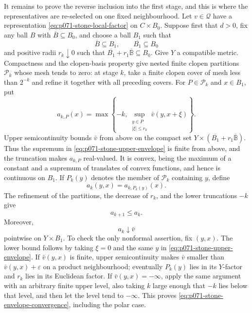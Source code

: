 It remains to prove the reverse inclusion into the first stage, and this is
where the representatives are re-selected on one fixed neighbourhood.  Let
\(v\in\mathscr Q\) have a representation
\eqref{eq:p071-stone-local-factor} on \(C\times B_0\).  Suppose first that
\(d>0\), fix any ball \(B\) with \(\overline B\subseteq B_0\), and choose a
ball \(B_1\) such that
\begin{equation}
\label{eq:p071-stone-nested-balls}
                 \overline B\subseteq B_1,
                 \qquad \overline{B_1}\subseteq B_0
\end{equation}
and positive radii \(r_k\downarrow0\) such that
\(\overline{B_1}+r_1\overline{\mathbb B}\subseteq B_0\).  Give \(Y\) a
compatible metric.  Compactness and the clopen-basis property give nested
finite clopen partitions \(\mathcal P_k\) whose mesh tends to zero: at
stage \(k\), take a finite clopen cover of mesh less than \(2^{-k}\) and
refine it together with all preceding covers.  For
\(P\in\mathcal P_k\) and \(x\in B_1\), put
\begin{equation}
\label{eq:p071-stone-upper-envelope}
 a_{k,P}(x)=
 \max\left\{-k,
   \sup_{\substack{y\in P\\ |\xi|\leq r_k}}
          \bar v(y,x+\xi)\right\}.
\end{equation}
Upper semicontinuity bounds \(\bar v\) from above on the compact set
\(Y\times(\overline{B_1}+r_1\overline{\mathbb B})\).  Thus the supremum in
\eqref{eq:p071-stone-upper-envelope} is finite from above, and the
truncation makes \(a_{k,P}\) real-valued.  It is convex, being the maximum
of a constant and a supremum of translates of convex functions, and hence
is continuous on \(B_1\).  If \(P_k(y)\) denotes the member of
\(\mathcal P_k\) containing
\(y\), define
\begin{equation}
\label{eq:p071-stone-piecewise-envelope}
                         a_k(y,x)=a_{k,P_k(y)}(x).
\end{equation}
The refinement of the partitions, the decrease of \(r_k\), and the lower
truncations \(-k\) give
\begin{equation}
\label{eq:p071-stone-envelope-monotonicity}
                          a_{k+1}\leq a_k.
\end{equation}
Moreover,
\begin{equation}
\label{eq:p071-stone-envelope-convergence}
                          a_k\downarrow\bar v
\end{equation}
pointwise on \(Y\times B_1\).  To check the only nonformal assertion, fix
\((y,x)\).  The lower bound follows by taking \(\xi=0\) and the same \(y\)
in \eqref{eq:p071-stone-upper-envelope}.  If \(\bar v(y,x)\) is finite,
upper semicontinuity makes
\(\bar v\) smaller than \(\bar v(y,x)+\varepsilon\) on a product
neighbourhood; eventually \(P_k(y)\) lies in its \(Y\)-factor and
\(r_k\) lies in its Euclidean factor.  If \(\bar v(y,x)=-\infty\), apply
the same argument with an arbitrary finite upper level, also taking \(k\)
large enough that \(-k\) lies below that level, and then let the level tend
to \(-\infty\).  This proves
\eqref{eq:p071-stone-envelope-convergence}, including the polar case.

